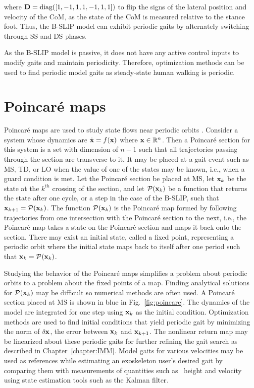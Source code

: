 %
%
where $ \mathbf{D} = {\rm diag}([1 ,-1 ,1 ,1 ,-1 ,1 ,1]) $ to flip the signs of the lateral position and velocity of the CoM, as the state of the CoM is measured relative to the stance foot. Thus, the B-SLIP model can exhibit periodic gaits by alternately switching through SS and DS phases.

As the B-SLIP model is passive, it does not have any active control inputs to modify gaits and maintain periodicity. Therefore, optimization methods can be used to find periodic model gaits \cite{strogatz2018nonlinear,garcia1998simplest} as steady-state human walking is periodic. 

\section{Poincar\'e maps}

Poincar\'e maps are used to study state flows near periodic orbits \cite{strogatz2018nonlinear}. Consider a system whose dynamics are $ \dot{\mathbf{x}} = f(\mathbf{x}) $ where $ \mathbf{x} \in \mathbb{R}^n $. Then a  Poincar\'e section for this system is a set with dimension of $ n-1 $ such that all trajectories passing through the section are transverse to it. It may be placed at a gait event such as MS, TD, or LO when the value of one of the states may be known, i.e., when a guard condition is met. Let the Poincar\'e section be placed at MS, let $ \mathbf{x}_k $ be the state at the $ k^{th} $ crossing of the section, and let $ \mathcal{P}(\mathbf{x}_k) $ be a function that returns the state after one cycle, or a step in the case of the B-SLIP, such that $ \mathbf{x}_{k+1} = \mathcal{P}(\mathbf{x}_k) $. The function $ \mathcal{P}(\mathbf{x}_k) $ is the Poincar\'e map formed by following trajectories from one intersection with the Poincar\'e section to the next, i.e., the Poincar\'e map takes a state on the Poincar\'e section and maps it back onto the section. There may exist an initial state, called a fixed point, representing a periodic orbit where the initial state maps back to itself after one period such that $ \mathbf{x}_k = \mathcal{P}(\mathbf{x}_k) $. 

Studying the behavior of the Poincar\'e maps simplifies a problem about periodic orbits to a problem about the fixed points of a map. Finding analytical solutions for $ \mathcal{P}(\mathbf{x}_k) $ may be difficult so numerical methods are often used. A Poincar\'e section placed at MS is shown in blue in Fig.~\ref{fig:poincare}. The dynamics of the model are integrated for one step using $ \mathbf{x}_k $ as the initial condition. Optimization methods are used to find initial conditions that yield periodic gait by minimizing the norm of $ \delta \mathbf{x} $, the error between $ \mathbf{x}_k $ and $ \mathbf{x}_{k+1} $. The nonlinear return map may be linearized about these periodic gaits for further refining the gait search as described in Chapter~\ref{chapter:IMM}. Model gaits for various velocities may be used as references while estimating an exoskeleton user's desired gait by comparing them with measurements of quantities such as \COM~height and velocity using state estimation tools such as the Kalman filter. 

